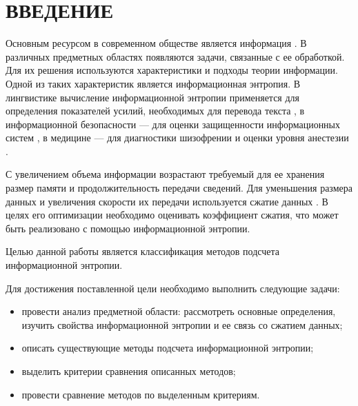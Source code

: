 \chapter*{ВВЕДЕНИЕ}

Основным ресурсом в современном обществе является информация \cite{society}. В различных предметных областях появляются задачи, связанные с ее обработкой. Для их решения используются характеристики и подходы теории информации. Одной из таких характеристик является информационная энтропия. В лингвистике вычисление информационной энтропии применяется для определения показателей усилий, необходимых для перевода текста \cite{translation}, в информационной безопасности --- для оценки защищенности информационных систем \cite{security}, в медицине --- для диагностики шизофрении \cite{mind} и оценки уровня анестезии \cite{anesthesia}.

С увеличением объема информации возрастают требуемый для ее хранения размер памяти и продолжительность передачи сведений. Для уменьшения размера данных и увеличения скорости их передачи используется сжатие данных \cite{data-compression}. В целях его оптимизации необходимо оценивать коэффициент сжатия, что может быть реализовано с помощью информационной энтропии.

Целью данной работы является классификация методов подсчета информационной энтропии.

Для достижения поставленной цели необходимо выполнить следующие задачи:

\begin{itemize}
	\item провести анализ предметной области: рассмотреть основные определения, изучить свойства информационной энтропии и ее связь со сжатием данных;
	\item описать существующие методы подсчета информационной энтропии;
	\item выделить критерии сравнения описанных методов;
	\item провести сравнение методов по выделенным критериям.
\end{itemize}